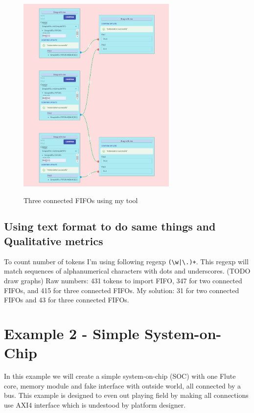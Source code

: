 \documentclass[14pt]{report}
\begin{document}
\begin{figure}
    \caption{Three connected FIFOs using my tool}
    \includegraphics[width=0.7\textwidth]{images/Example1MySolution.png} \\
    \centering
\end{figure}

\subsection{Using text format to do same things and Qualitative metrics}
To count number of tokens I'm using following regexp \verb!(\w|\.)+!. This regexp will match sequences of alphanumerical characters with dots and underscores. (TODO draw graphs)
Raw numbers: 431 tokens to import FIFO, 347 for two connected FIFOs, and 415 for three connected FIFOs.
My solution: 31 for two connected FIFOs and 43 for three connected FIFOs.

\section{Example 2 - Simple System-on-Chip}
In this example we will create a simple system-on-chip (SOC) with one Flute core, memory module and fake interface with outside world, all connected by a bus. This example is designed to even out playing field by making all connections use AXI4 interface which is undestood by platform designer.
\end{document}
